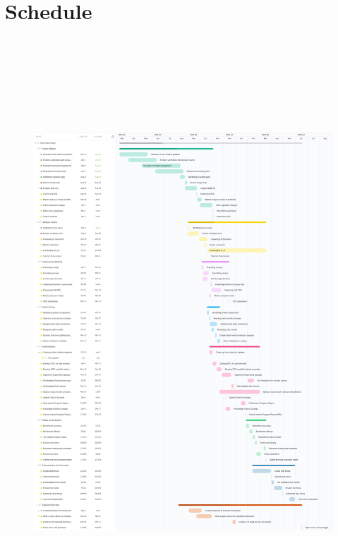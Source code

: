 \section{Schedule}
\begin{figure}[!ht]
    \includegraphics[height=22cm]{assets/gantt-chart.jpg}
\end{figure}



